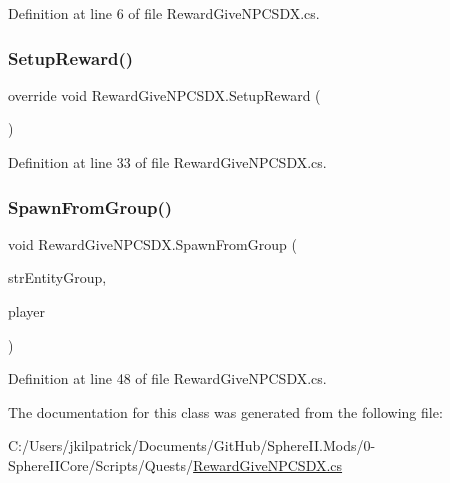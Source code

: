Definition at line 6 of file Reward\+Give\+N\+P\+C\+S\+D\+X.\+cs.

\mbox{\label{class_reward_give_n_p_c_s_d_x_a35c70f880e1e1e3e388cb1d910490cf2}} 
\subsubsection{\texorpdfstring{SetupReward()}{SetupReward()}}
{\footnotesize\ttfamily override void Reward\+Give\+N\+P\+C\+S\+D\+X.\+Setup\+Reward (\begin{DoxyParamCaption}{ }\end{DoxyParamCaption})}



Definition at line 33 of file Reward\+Give\+N\+P\+C\+S\+D\+X.\+cs.

\mbox{\label{class_reward_give_n_p_c_s_d_x_aa22d3c6f10499f3f740897ec11f62237}} 
\subsubsection{\texorpdfstring{SpawnFromGroup()}{SpawnFromGroup()}}
{\footnotesize\ttfamily void Reward\+Give\+N\+P\+C\+S\+D\+X.\+Spawn\+From\+Group (\begin{DoxyParamCaption}\item[{string}]{str\+Entity\+Group,  }\item[{Entity\+Player}]{player }\end{DoxyParamCaption})}



Definition at line 48 of file Reward\+Give\+N\+P\+C\+S\+D\+X.\+cs.



The documentation for this class was generated from the following file\+:\begin{DoxyCompactItemize}
\item 
C\+:/\+Users/jkilpatrick/\+Documents/\+Git\+Hub/\+Sphere\+I\+I.\+Mods/0-\/\+Sphere\+I\+I\+Core/\+Scripts/\+Quests/\mbox{\hyperlink{_reward_give_n_p_c_s_d_x_8cs}{Reward\+Give\+N\+P\+C\+S\+D\+X.\+cs}}\end{DoxyCompactItemize}
